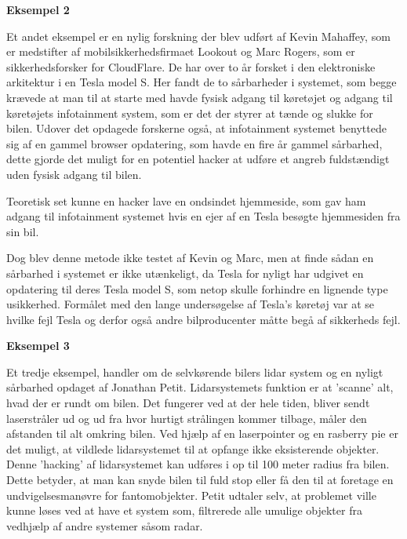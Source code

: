 \noindent \textbf{Eksempel 2}

Et andet eksempel er en nylig forskning der blev udført af Kevin Mahaffey, som er medstifter af mobilsikkerhedsfirmaet Lookout og Marc Rogers, som er sikkerhedsforsker for CloudFlare. De har over to år forsket i den elektroniske arkitektur i en Tesla model S. Her fandt de to sårbarheder i systemet, som begge krævede at man til at starte med havde fysisk adgang til køretøjet og adgang til køretøjets infotainment system, som er det der styrer at tænde og slukke for bilen. Udover det opdagede forskerne også, at infotainment systemet benyttede sig af en gammel browser opdatering, som havde en fire år gammel sårbarhed, dette gjorde det muligt for en potentiel hacker at udføre et angreb fuldstændigt uden fysisk adgang til bilen.

Teoretisk set kunne en hacker lave en ondsindet hjemmeside, som gav ham adgang til infotainment systemet hvis en ejer af en Tesla besøgte hjemmesiden fra sin bil.

Dog blev denne metode ikke testet af Kevin og Marc, men at finde sådan en sårbarhed i systemet er ikke utænkeligt, da Tesla for nyligt har udgivet en opdatering til deres Tesla model S, som netop skulle forhindre en lignende type usikkerhed.  Formålet med den lange undersøgelse af Tesla's køretøj var at se hvilke fejl Tesla og derfor også andre bilproducenter måtte begå af sikkerheds fejl.

\noindent \textbf{Eksempel 3}

Et tredje eksempel, handler om de selvkørende bilers lidar system og en nyligt sårbarhed opdaget af Jonathan Petit. Lidarsystemets funktion er at 'scanne' alt, hvad der er rundt om bilen. Det fungerer ved at der hele tiden, bliver sendt laserstråler ud og ud fra hvor hurtigt strålingen kommer tilbage, måler den afstanden til alt omkring bilen. Ved hjælp af en laserpointer og en rasberry pie er det muligt, at vildlede lidarsystemet til at opfange ikke eksisterende objekter. Denne 'hacking' af lidarsystemet kan udføres i op til 100 meter radius fra bilen. Dette betyder, at man kan snyde bilen til fuld stop eller få den til at foretage en  undvigelsesmanøvre for fantomobjekter. Petit udtaler selv, at problemet ville kunne løses ved at have et system som, filtrerede alle umulige objekter fra vedhjælp af andre systemer såsom radar. 
